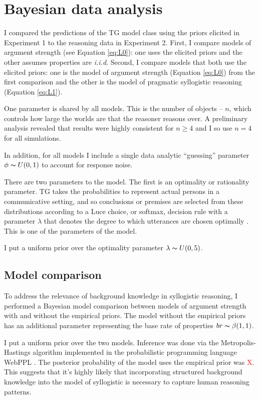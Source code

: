 \documentclass{llncs} %
\newcommand{\red}[1]{\textcolor{Red}{#1}}
\begin{document}
\section{Bayesian data analysis}

I compared the predictions of the TG model class using the priors elicited in Experiment 1 to the reasoning data in Experiment 2.  First, I compare models of argument strength (see Equation \ref{eq:L0}): one uses the elicited priors and the other assumes properties are \emph{i.i.d}. Second, I compare models that both use the elicited priors: one is the model of argument strength (Equation \ref{eq:L0}) from the first comparison and the other is the model of pragmatic syllogistic reasoning (Equation \ref{eq:L1}).

One parameter is shared by all models. This is the number of objects -- $n$, which controls how large the worlds are that the reasoner reasons over. A preliminary analysis revealed that results were highly consistent for $n \geq 4$ and I so use $n=4$ for all simulations.  

In addition, for all models I include a single data analytic ``guessing'' parameter $\phi \thicksim U(0,1)$ to account for response noise.

There are two parameters to the model. The first is an optimality or rationality parameter. TG takes the probabilities to represent actual persons in a communicative setting, and so conclusions or premises are selected from these distributions according to a Luce choice, or softmax, decision rule with a parameter $\lambda$ that denotes the degree to which utterances are chosen optimally \cite{Luce1959}. This is one of the parameters of the model. 

I put a uniform prior over the optimality parameter $\lambda \thicksim U(0,5)$.

\subsection{Model comparison}

To address the relevance of background knowledge in syllogistic reasoning, I performed a Bayesian model comparison between models of argument strength with and without the empirical priors. The model without the empirical priors has an additional parameter representing the base rate of properties  $br \thicksim \beta(1,1)$.

I put a uniform prior over the two models. Inference was done via the Metropolis-Hastings algorithm implemented in the probabilistic programming language WebPPL \cite{dippl}. The posterior probability of the model uses the empirical prior was \red{X}. This suggests that it's highly likely that incorporating structured background knowledge into the model of syllogistic is necessary to capture human reasoning patterns.
\end{document}
